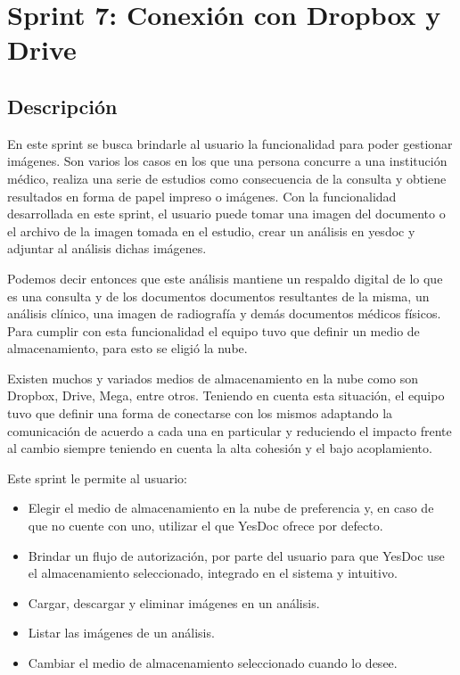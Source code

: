 \section{Sprint 7: Conexión con Dropbox y Drive} %

\subsection{Descripción}

En este sprint se busca brindarle al usuario la funcionalidad para poder gestionar imágenes. Son varios los casos en los que una persona concurre a una institución médico, realiza una serie de estudios como consecuencia de la consulta y obtiene resultados en forma de papel impreso o imágenes. Con la funcionalidad desarrollada en este sprint, el usuario puede tomar una imagen del documento o el archivo de la imagen tomada en el estudio, crear un análisis en yesdoc y adjuntar al análisis dichas imágenes.

 Podemos decir entonces que este análisis mantiene un respaldo digital de lo que es una consulta y de los documentos documentos resultantes de la misma, un análisis clínico, una imagen de radiografía y demás documentos médicos físicos. Para cumplir con esta funcionalidad el equipo tuvo que definir un medio de almacenamiento, para esto se eligió la nube. 
 
 Existen muchos y variados medios de almacenamiento en la nube como son Dropbox, Drive, Mega, entre otros. Teniendo en cuenta esta situación, el equipo tuvo que definir una forma de conectarse con los mismos adaptando la comunicación de acuerdo a cada una en particular y reduciendo el impacto frente al cambio siempre teniendo en cuenta la alta cohesión y el bajo acoplamiento.
	
	
	Este sprint le permite al usuario:
	\begin{itemize}
		\item Elegir el medio de almacenamiento en la nube de preferencia y, en caso de que no cuente con uno, utilizar el que YesDoc ofrece por defecto.
		\item Brindar un flujo de autorización, por parte del usuario para que YesDoc use el almacenamiento seleccionado, integrado en el sistema y intuitivo.
		\item Cargar, descargar y eliminar imágenes en un análisis.
		\item Listar las imágenes de un análisis.
		\item Cambiar el medio de almacenamiento seleccionado cuando lo desee. %
	\end{itemize}
	  

